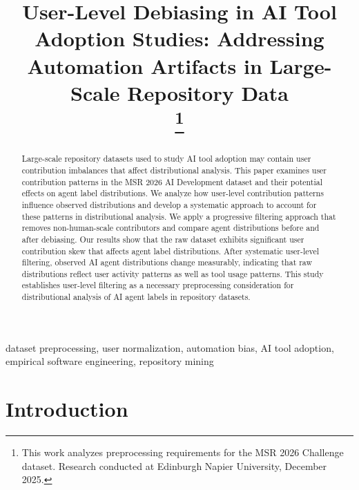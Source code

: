\documentclass[conference]{IEEEtran}
\begin{document}
\title{User-Level Debiasing in AI Tool Adoption Studies: Addressing Automation Artifacts in Large-Scale Repository Data\\
\thanks{This work analyzes preprocessing requirements for the MSR 2026 Challenge dataset. Research conducted at Edinburgh Napier University, December 2025.}
}

\author{
}

\maketitle

\begin{abstract}
Large-scale repository datasets used to study AI tool adoption may contain user contribution imbalances that affect distributional analysis. This paper examines user contribution patterns in the MSR 2026 AI Development dataset and their potential effects on agent label distributions. We analyze how user-level contribution patterns influence observed distributions and develop a systematic approach to account for these patterns in distributional analysis. We apply a progressive filtering approach that removes non-human-scale contributors and compare agent distributions before and after debiasing. Our results show that the raw dataset exhibits significant user contribution skew that affects agent label distributions. After systematic user-level filtering, observed AI agent distributions change measurably, indicating that raw distributions reflect user activity patterns as well as tool usage patterns. This study establishes user-level filtering as a necessary preprocessing consideration for distributional analysis of AI agent labels in repository datasets.
\end{abstract}

\begin{IEEEkeywords}
dataset preprocessing, user normalization, automation bias, AI tool adoption, empirical software engineering, repository mining
\end{IEEEkeywords}

\section{Introduction}
\end{document}
